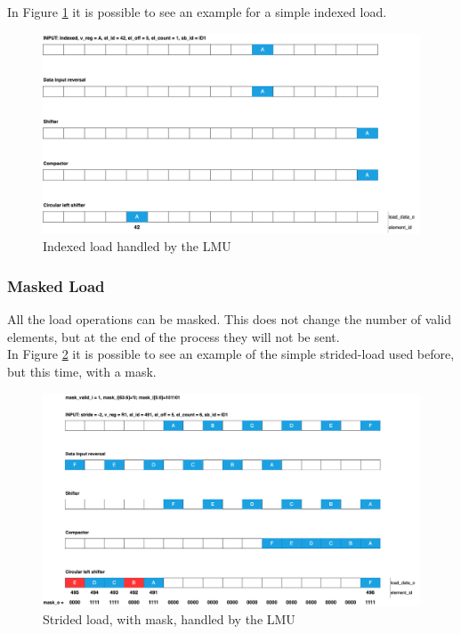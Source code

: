 In Figure \ref{lmu-indexed} it is possible to see an example for a simple indexed load.

\begin{figure}[H]
    \centering
    \includegraphics[scale = 0.25]{Chapter_2/img/lmu-indexed.png}
    \caption{Indexed load handled by the LMU}
    \label{lmu-indexed}
\end{figure}

\subsubsection{Masked Load}
All the load operations can be masked. This does not change the number of valid elements, but at the end of the process they will not be sent.\\


In Figure \ref{lmu-masked-stride} it is possible to see an example of the simple strided-load used before, but this time, with a mask.

\begin{figure}[H]
    \centering
    \includegraphics[scale = 0.25]{Chapter_2/img/lmu-masked-strided.png}
    \caption{Strided load, with mask, handled by the LMU}
    \label{lmu-masked-stride}
\end{figure}

